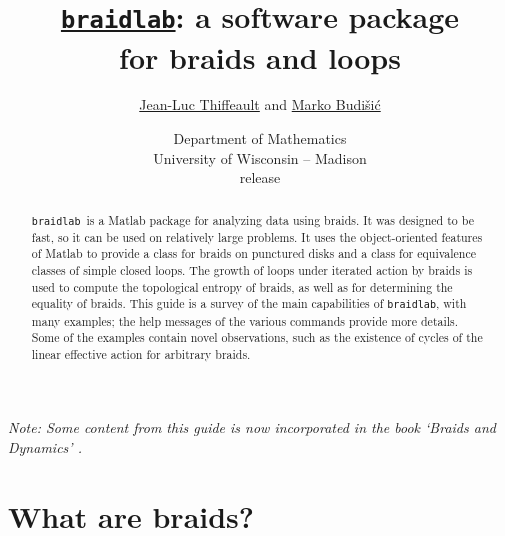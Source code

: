 \documentclass[12pt]{article}
\newcommand{\braidlab}{\texttt{braidlab}}%
\begin{document}

    {\lstset{frame=single,framerule=0pt}}
    {}

\lstset{style=braidlabStyle}


\title{\href{{https://github.com/jeanluct/braidlab}}{\braidlab}:
  a software package \\ for braids and loops}
\author{%
\href{https://people.math.wisc.edu/~thiffeault/}{Jean-Luc Thiffeault}
  and
\href{https://mbudisic.wordpress.com}{Marko Budi\v{s}i\'{c}}
}
\date{{\small Department of Mathematics\\ University of
    Wisconsin -- Madison} \\[10pt]
  release } %

\maketitle

\begin{abstract}
  \braidlab\ is a Matlab package for analyzing data using braids.  It was
  designed to be fast, so it can be used on relatively large problems.  It
  uses the object-oriented features of Matlab to provide a class for braids on
  punctured disks and a class for equivalence classes of simple closed loops.
  The growth of loops under iterated action by braids is used to compute the
  topological entropy of braids, as well as for determining the equality of
  braids.  This guide is a survey of the main capabilities of \braidlab, with
  many examples; the help messages of the various commands provide more
  details.  Some of the examples contain novel observations, such as the
  existence of cycles of the linear effective action for arbitrary braids.
\end{abstract}

\noindent
\textsl{Note: Some content from this guide is now incorporated in the book
  `Braids and Dynamics' \citep{Thiffeault_braids_and_dynamics}.}

\tableofcontents


\section{What are braids?}
\end{document}

